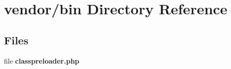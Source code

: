 \section{vendor/bin Directory Reference}
\label{dir_436b5ee5e751f5c442372b1bcc764485}
\subsection*{Files}
\begin{DoxyCompactItemize}
\item 
file {\bf classpreloader.\+php}
\end{DoxyCompactItemize}
